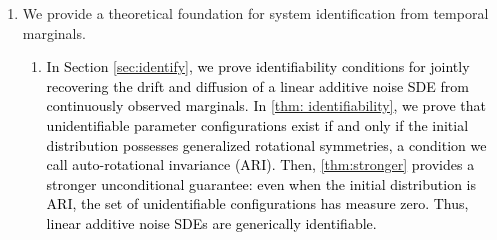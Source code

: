 \documentclass[twoside,11pt]{article}
\newcommand{\rv}[1]{\textcolor{black}{#1}}
\begin{document}
\begin{enumerate}
    \item We provide a theoretical foundation for system identification from temporal marginals.\begin{enumerate}
        \item  \rv{In Section \ref{sec:identify}, we prove identifiability conditions for jointly recovering the drift and diffusion of a linear additive noise SDE from continuously observed marginals. In \cref{thm: identifiability}, we prove that unidentifiable parameter configurations exist if and only if the initial distribution possesses generalized rotational symmetries, a condition we call auto-rotational invariance (ARI). Then, \cref{thm:stronger} provides a stronger unconditional guarantee: even when the initial distribution is ARI, the set of unidentifiable configurations has measure zero. Thus, linear additive noise SDEs are generically identifiable.}
        

\end{enumerate}
\end{enumerate}
\end{document}
